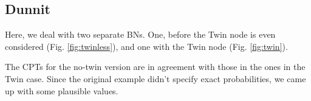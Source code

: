 \documentclass[10pt,]{scrartcl}
\begin{document}
\begin{table}[H]
\centering
{}
\end{table}

\subsection{Dunnit}\label{dunnit-1}

Here, we deal with two separate BNs. One, before the \textsf{Twin} node
is even considered (Fig. \ref{fig:twinless}), and one with the
\textsf{Twin} node (Fig. \ref{fig:twin}).

The CPTs for the no-twin version are in agreement with those in the ones
in the Twin case. Since the original example didn't specify exact
probabilities, we came up with some plausible values.
\end{document}

